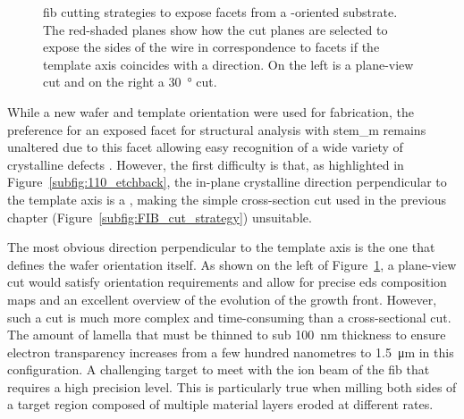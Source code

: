 \begin{figure}
    \caption[\acs{fib} cutting strategies to expose  facets from a \hkl(1 1 0) substrate.]{\acs{fib} cutting strategies to expose  facets from a \hkl[1 1 0]-oriented substrate. The red-shaded planes show how the cut planes are selected to expose the sides of the wire in correspondence to  facets if the template axis coincides with a  direction. On the left is a plane-view cut and on the right a \qty{30}{\degree} cut.}
    \label{fig:110_FIB}
\end{figure}

While a new  wafer and  template orientation were used for fabrication, the preference for an exposed  facet for structural analysis with \acs{stem_m} remains unaltered due to this facet allowing easy recognition of a wide variety of crystalline defects \cite{Dasilva2017}. However, the first difficulty is that, as highlighted in Figure~\ref{subfig:110_etchback}, the in-plane crystalline direction perpendicular to the  template axis is a , making the simple cross-section cut used in the previous chapter (Figure~\ref{subfig:FIB_cut_strategy}) unsuitable.

The most obvious  direction perpendicular to the  template axis is the one that defines the wafer orientation itself. As shown on the left of Figure~\ref{fig:110_FIB}, a plane-view cut would satisfy orientation requirements and allow for precise \acf{eds} composition maps and an excellent overview of the evolution of the growth front. However, such a cut is much more complex and time-consuming than a cross-sectional cut. The amount of lamella that must be thinned to sub \qty{100}{\nano\metre} thickness to ensure electron transparency increases from a few hundred nanometres to \qty{1.5}{\micro\metre} in this configuration. A challenging target to meet with the ion beam of the \acs{fib} that requires a high precision level. This is particularly true when milling both sides of a target region composed of multiple material layers eroded at different rates.

